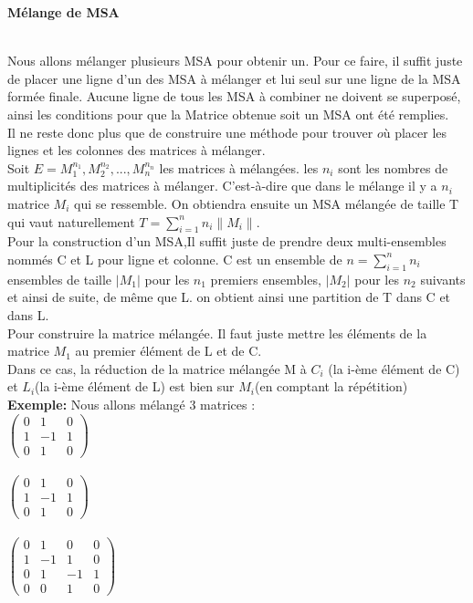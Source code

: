 \documentclass{book}
\begin{document}
\begin{large}
  \textbf{Mélange de MSA}
  \end{large}   \\
   Nous allons mélanger plusieurs MSA pour obtenir un. Pour ce faire, il suffit juste de placer une ligne d'un des MSA à mélanger et lui seul sur une ligne de la MSA formée finale. Aucune ligne de tous les MSA à combiner ne doivent se superposé, ainsi les conditions pour que la Matrice obtenue soit un MSA ont été remplies. \\
   Il ne reste donc plus que de construire une méthode pour trouver $où$ placer les lignes et les colonnes des matrices à mélanger. \\
   Soit $E={M_1^{n_1}, M_2^{n_2}, ... , M_n^{n_n}}$ les matrices à mélangées. les $n_i$ sont les nombres de multiplicités des matrices à mélanger. C'est-à-dire que dans le mélange il y a $n_i$ matrice $M_i$ qui se ressemble. On obtiendra ensuite un MSA mélangée de taille T qui vaut naturellement $T=\sum_{i=1}^{n} n_i \|M_i\|$. \\ 
   Pour la construction d'un MSA,Il suffit juste de prendre deux multi-ensembles nommés C et L pour ligne et colonne. C est un ensemble de $n=\sum_{i=1}^{n} n_i$ ensembles de taille $|M_1|$ pour les $n_1$ premiers ensembles, $|M_2|$ pour les $n_2$ suivants et ainsi de suite, de même que L. on obtient ainsi une partition de T dans C et dans L. \\
   Pour construire la matrice mélangée. Il faut juste mettre les éléments de la matrice $M_1$ au premier élément de L et de C. 
   \\ Dans ce cas, la réduction de la matrice mélangée M à $C_i$ (la i-ème élément de C) et $L_i$(la i-ème élément de L) est bien sur $M_i$(en comptant la répétition)\\
   \textbf{Exemple: } 
   Nous allons mélangé 3 matrices :\\ 
   $ \begin{pmatrix}
 0&1&0\\1&-1&1\\0&1&0
 \end{pmatrix}$ \\\\
$ \begin{pmatrix}
  0&1&0\\1&-1&1\\0&1&0
 \end{pmatrix}$ \\\\
$ \begin{pmatrix}
 0&1&0&0\\1&-1&1&0\\0&1&-1&1\\0&0&1&0
 \end{pmatrix}$\\\\
\end{document}
